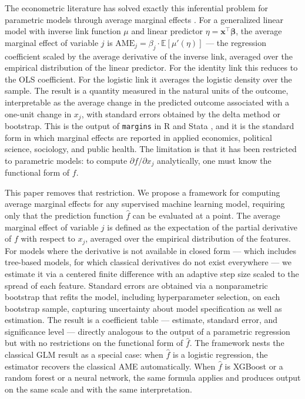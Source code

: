 \documentclass[12pt]{article}
\begin{document}
	The econometric literature has solved exactly this inferential problem for parametric models through average marginal effects \citep{greene2012, wooldridge2010}. For a generalized linear model with inverse link function $\mu$ and linear predictor $\eta = \mathbf{x}^\top \boldsymbol{\beta}$, the average marginal effect of variable $j$ is $\mathrm{AME}_j = \beta_j \cdot \mathbb{E}[\mu'(\eta)]$ --- the regression coefficient scaled by the average derivative of the inverse link, averaged over the empirical distribution of the linear predictor. For the identity link this reduces to the OLS coefficient. For the logistic link it averages the logistic density over the sample. The result is a quantity measured in the natural units of the outcome, interpretable as the average change in the predicted outcome associated with a one-unit change in $x_j$, with standard errors obtained by the delta method or bootstrap. This is the output of \texttt{margins} in R and Stata \citep{leeper2021}, and it is the standard form in which marginal effects are reported in applied economics, political science, sociology, and public health. The limitation is that it has been restricted to parametric models: to compute $\partial f / \partial x_j$ analytically, one must know the functional form of $f$.
	
	This paper removes that restriction. We propose a framework for computing average marginal effects for any supervised machine learning model, requiring only that the prediction function $\hat{f}$ can be evaluated at a point. The average marginal effect of variable $j$ is defined as the expectation of the partial derivative of $f$ with respect to $x_j$, averaged over the empirical distribution of the features. For models where the derivative is not available in closed form --- which includes tree-based models, for which classical derivatives do not exist everywhere --- we estimate it via a centered finite difference with an adaptive step size scaled to the spread of each feature. Standard errors are obtained via a nonparametric bootstrap \citep{efron1979, efrontibshirani1993} that refits the model, including hyperparameter selection, on each bootstrap sample, capturing uncertainty about model specification as well as estimation. The result is a coefficient table --- estimate, standard error, and significance level --- directly analogous to the output of a parametric regression but with no restrictions on the functional form of $\hat{f}$. The framework nests the classical GLM result as a special case: when $\hat{f}$ is a logistic regression, the estimator recovers the classical AME automatically. When $\hat{f}$ is XGBoost or a random forest or a neural network, the same formula applies and produces output on the same scale and with the same interpretation.
	
\end{document}
